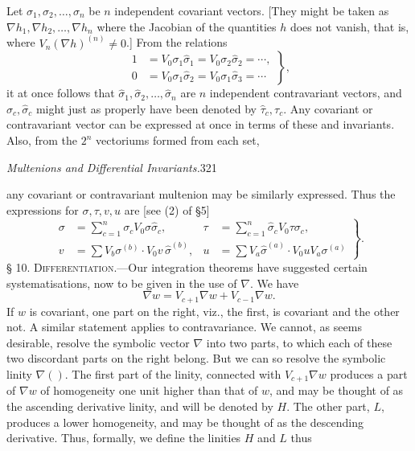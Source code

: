 \documentclass[11pt]{article}
\begin{document}
\indent Let $\sigma_1,\sigma_2,\ldots,\sigma_n$ be $n$ independent covariant vectors. [They might be taken as $\nabla h_1,\nabla h_2,\ldots,\nabla h_n$ where the Jacobian of the quantities $h$ does not vanish, that is, where $V_n(\nabla h)^{(n)}\ne0$.] From the relations
\begin{equation}\left.\begin{aligned}1&=V_0\sigma_1\hat{\sigma}_1=V_0\sigma_2\hat{\sigma}_2=\cdots,\\0&=V_0\sigma_1\hat{\sigma}_2=V_0\sigma_1\hat{\sigma}_3=\cdots\end{aligned}\right\},\tag{16}\end{equation}
it at once follows that $\hat{\sigma}_1,\hat{\sigma}_2,\ldots,\hat{\sigma}_n$ are $n$ independent contravariant vectors, and $\sigma_c,\hat{\sigma}_c$ might just as properly have been denoted by $\hat{\tau}_c,\tau_c$. Any covariant or contravariant vector can be expressed at once in terms of these and invariants. Also, from the $2^n$ vectoriums formed from each set,
\newpage\thispagestyle{empty}\begin{center}\textit{Multenions and Differential Invariants.}\hfill 321\end{center}
any covariant or contravariant multenion may be similarly expressed. Thus the expressions for $\sigma,\tau,v,u$ are [see (2) of §5]
\begin{equation}\left.\begin{aligned}\sigma&=\sum_{c=1}^n\sigma_cV_0\sigma\hat{\sigma}_c,&\tau&=\sum_{c=1}^n\hat{\sigma}_cV_0\tau\sigma_c,\\v&=\sum V_b\sigma^{(b)}\cdot V_0v\,\hat{\sigma}^{(b)},&u&=\sum V_a\hat{\sigma}^{(a)}\cdot V_0uV_a\sigma^{(a)}\end{aligned}\right\}.\tag{17}\end{equation}
\noindent\textsc{§ 10. Differentiation.}---Our integration theorems have suggested certain systematisations, now to be given in the use of $\nabla$. We have
\[\nabla w=V_{c+1}\nabla w+V_{c-1}\nabla w.\]
If $w$ is covariant, one part on the right, viz., the first, is covariant and the other not. A similar statement applies to contravariance. We cannot, as seems desirable, resolve the symbolic vector $\nabla$ into two parts, to which each of these two discordant parts on the right belong. But we can so resolve the symbolic linity $\nabla()$. The first part of the linity, connected with $V_{c+1}\nabla w$ produces a part of $\nabla w$ of homogeneity one unit higher than that of $w$, and may be thought of as the ascending derivative linity, and will be denoted by $H$. The other part, $L$, produces a lower homogeneity, and may be thought of as the descending derivative. Thus, formally, we define the linities $H$ and $L$ thus
\end{document}
